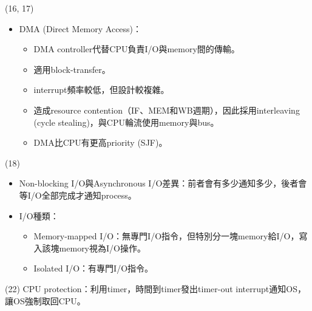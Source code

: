 \begin{theorem}{(16, 17)}
\begin{itemize}
\begin{itemize}
        \end{itemize}
        \item DMA (Direct Memory Access)：\begin{itemize}
            \item DMA controller代替CPU負責I/O與memory間的傳輸。
            \item 適用block-transfer。
            \item interrupt頻率較低，但設計較複雜。
            \item 造成resource contention（IF、MEM和WB週期），因此採用interleaving (cycle stealing)，與CPU輪流使用memory與bus。
            \item DMA比CPU有更高priority (SJF)。
        \end{itemize}
    \end{itemize}
\end{theorem}

\item \begin{theorem}{(18)} \quad\quad \begin{itemize}
        \item Non-blocking I/O與Asynchronous I/O差異：前者會有多少通知多少，後者會等I/O全部完成才通知process。
        \item I/O種類：\begin{itemize}
            \item Memory-mapped I/O：無專門I/O指令，但特別分一塊memory給I/O，寫入該塊memory視為I/O操作。
            \item Isolated I/O：有專門I/O指令。
        \end{itemize}
    \end{itemize}
\end{theorem}

\item \begin{theorem}{(22)} CPU protection：利用timer，時間到timer發出timer-out interrupt通知OS，讓OS強制取回CPU。
\end{theorem}

